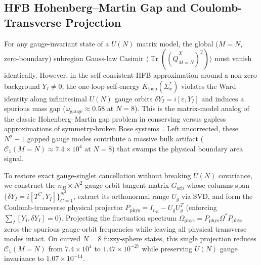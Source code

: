 \documentclass[11pt,a4paper]{article}
\DeclareMathOperator{\Tr}{Tr}
\begin{document}
\subsection{HFB Hohenberg--Martin Gap and Coulomb-Transverse Projection}
\label{sec:hm_proj}
For any gauge-invariant state of a $U(N)$ matrix model, the global ($M=N$, zero-boundary) subregion Gauss-law Casimir $\langle\Tr((\hat{Q}^X_{M=N})^2)\rangle$ must vanish identically. However, in the self-consistent HFB approximation around a non-zero background $Y_I \neq 0$, the one-loop self-energy $K_{\mathrm{loop}}(\Sigma_x^*)$ violates the Ward identity along infinitesimal $U(N)$ gauge orbits $\delta Y_I = i[\varepsilon, Y_I]$ and induces a spurious mass gap ($\omega_{\mathrm{gauge}} \approx 0.58$ at $N=8$). This is the matrix-model analog of the classic Hohenberg--Martin gap problem in conserving versus gapless approximations of symmetry-broken Bose systems~\cite{Hohenberg1965}. Left uncorrected, these $N^2-1$ gapped gauge modes contribute a massive bulk artifact ($\mathcal{C}_1(M=N) \approx 7.4\times 10^4$ at $N=8$) that swamps the physical boundary area signal.

To restore exact gauge-singlet cancellation without breaking $U(N)$ covariance, we construct the $n_B \times N^2$ gauge-orbit tangent matrix $G_{\mathrm{orb}}$ whose columns span $\{\delta Y_I = i[T^C, Y_I]\}_{C=1}^{N^2}$, extract its orthonormal range $U_g$ via SVD, and form the Coulomb-transverse physical projector $P_{\mathrm{phys}} = I_{n_B} - U_g U_g^T$ (enforcing $\sum_I [Y_I, \delta Y_I] = 0$). Projecting the fluctuation spectrum $\Omega_{\mathrm{phys}} = P_{\mathrm{phys}}\Omega^* P_{\mathrm{phys}}$ zeros the spurious gauge-orbit frequencies while leaving all physical transverse modes intact. On curved $N=8$ fuzzy-sphere states, this single projection reduces $\mathcal{C}_1(M=N)$ from $7.4\times 10^4$ to $1.47\times 10^{-27}$ while preserving $U(N)$ gauge invariance to $1.07\times 10^{-14}$.
\end{document}
